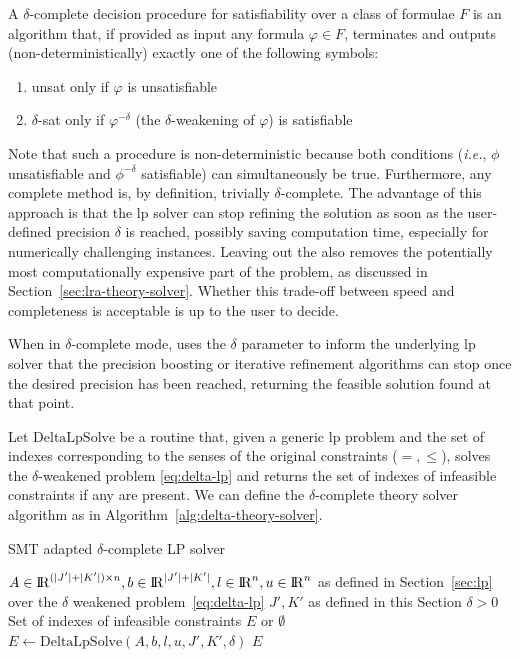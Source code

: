 \documentclass[runningheads]{llncs}
\begin{document}
\begin{definition}\cite{paper:delta-complete}
    A $\delta$-complete decision procedure for satisfiability over a class of formulae $F$ is an algorithm that, if provided as input any formula $\varphi \in F$, terminates and outputs (non-deterministically) exactly one of the following symbols:
    \begin{enumerate}
        \item unsat only if $\varphi$ is unsatisfiable
        \item $\delta$-sat only if $\varphi^{-\delta}$ (the $\delta$-weakening of $\varphi$) is satisfiable
    \end{enumerate}
\end{definition}
Note that such a procedure is non-deterministic because both conditions ({\em i.e.}, $\phi$ unsatisfiable and $\phi^{-\delta}$ satisfiable) can simultaneously be true.
Furthermore, any complete method is, by definition, trivially $\delta$-complete.
The advantage of this approach is that the \gls{lp} solver can stop refining the solution as soon as the user-defined precision $\delta$ is reached, possibly saving computation time, especially for numerically challenging instances.
Leaving out the \nqcs also removes the potentially most computationally expensive part of the problem, as discussed in Section~\ref{sec:lra-theory-solver}.
Whether this trade-off between speed and completeness is acceptable is up to the user to decide.

When in $\delta$-complete mode, \dlinear uses the $\delta$ parameter to inform the underlying \gls{lp} solver that the precision boosting or iterative refinement algorithms can stop once the desired precision has been reached, returning the feasible solution found at that point.

Let $\text{DeltaLpSolve}$ be a routine that, given a generic \gls{lp} problem and the set of indexes corresponding to the senses of the original constraints ($=, \le$), solves the $\delta$-weakened problem \eqref{eq:delta-lp} and returns the set of indexes of infeasible constraints if any are present.
We can define the $\delta$-complete theory solver algorithm as in Algorithm~\ref{alg:delta-theory-solver}.

\begin{algorithm}
    \caption{SMT adapted $\delta$-complete LP solver}\label{alg:delta-theory-solver}
    \begin{algorithmic}
        \Require $A \in {\rm I\!R}^{(|J'| + |K'|) \times n}, b \in {\rm I\!R}^{|J'| + |K'|}, l \in {\rm I\!R}^n, u \in {\rm I\!R}^n$ \newline
        \qquad as defined in Section~\ref{sec:lp} over the $\delta$ weakened problem~\eqref{eq:delta-lp}
        \Require $J', K'$ as defined in this Section
        \Require $\delta > 0$
        \Ensure Set of indexes of infeasible constraints $E$ or $\emptyset$
        \State $E \gets \text{DeltaLpSolve}(A, b, l, u, J', K', \delta)$ 
        \State \Return $E$
    \end{algorithmic}
\end{algorithm}
\end{document}
